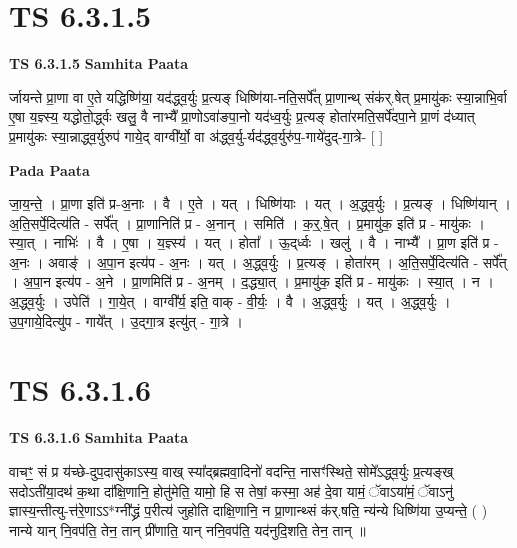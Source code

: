 \documentclass[17pt]{extarticle}
\begin{document}
\section*{ TS 6.3.1.5 }

\textbf{TS 6.3.1.5 } \newline
\textbf{Samhita Paata} \newline

र्जायन्ते प्रा॒णा वा ए॒ते यद्धिष्णि॑या॒ यद॑द्ध्व॒र्युः प्र॒त्यङ् धिष्णि॑या-नति॒सर्पे᳚त् प्रा॒णान्थ् संक॑र्.षेत् प्र॒मायु॑कः स्या॒न्नाभि॒र्वा ए॒षा य॒ज्ञ्स्य॒ यद्धोतो॒र्द्ध्वः खलु॒ वै नाभ्यै᳚ प्रा॒णोऽवा॑ङपा॒नो यद॑ध्व॒र्युः प्र॒त्यङ् होता॑रमति॒सर्पे॑दपा॒ने प्रा॒णं द॑ध्यात् प्र॒मायु॑कः स्या॒न्नाद्ध्व॒र्युरुप॑ गाये॒द् वाग्वी᳚र्यो॒ वा अ॑द्ध्व॒र्यु-र्यद॑द्ध्व॒र्युरु॑प॒-गाये॑दुद्-गा॒त्रे- [  ] \newline

\textbf{Pada Paata} \newline

जा॒य॒न्ते॒ । प्रा॒णा इति॑ प्र-अ॒नाः । वै । ए॒ते । यत् । धिष्णि॑याः । यत् । अ॒द्ध्व॒र्युः । प्र॒त्यङ् । धिष्णि॑यान् । अ॒ति॒सर्पे॒दित्य॑ति - सर्पे᳚त् । प्रा॒णानिति॑ प्र - अ॒नान् । समिति॑ । क॒र्॒.षे॒त् । प्र॒मायु॑क॒ इति॑ प्र - मायु॑कः । स्या॒त् । नाभिः॑ । वै । ए॒षा । य॒ज्ञ्स्य॑ । यत् । होता᳚ । ऊ॒द्‌र्ध्वः । खलु॑ । वै । नाभ्यै᳚ । प्रा॒ण इति॑ प्र - अ॒नः । अवाङ्॑ । अ॒पा॒न इत्य॑प - अ॒नः । यत् । अ॒द्ध्व॒र्युः । प्र॒त्यङ् । होता॑रम् । अ॒ति॒सर्पे॒दित्य॑ति - सर्पे᳚त् । अ॒पा॒न इत्य॑प - अ॒ने । प्रा॒णमिति॑ प्र - अ॒नम् । द॒द्ध्या॒त् । प्र॒मायु॑क॒ इति॑ प्र - मायु॑कः । स्या॒त् । न । अ॒द्ध्व॒र्युः । उपेति॑ । गा॒ये॒त् । वाग्वी᳚र्य॒ इति॒ वाक् - वी॒र्यः॒ । वै । अ॒द्ध्व॒र्युः । यत् । अ॒द्ध्व॒र्युः । उ॒प॒गाये॒दित्यु॑प - गाये᳚त् । उ॒द्गा॒त्र इत्यु॑त् - गा॒त्रे ।  \newline




\section*{ TS 6.3.1.6 }

\textbf{TS 6.3.1.6 } \newline
\textbf{Samhita Paata} \newline

वाचꣳ॒॒ सं प्र य॑च्छे-दुप॒दासु॑काऽस्य॒ वाख् स्या᳚द्ब्रह्मवा॒दिनो॑ वदन्ति॒ नासꣳ॑स्थिते॒ सोमे᳚ऽद्ध्व॒र्युः प्र॒त्यङ्ख् सदोऽती॑या॒दथ॑ क॒था दा᳚क्षि॒णानि॒ होतु॑मेति॒ यामो॒ हि स तेषां॒ कस्मा॒ अह॑ दे॒वा यामं॒ ॅवाऽया॑मं॒ ॅवाऽनु॑ ज्ञास्य॒न्तीत्यु-त्त॑रे॒णाऽऽ*ग्नी᳚द्ध्रं प॒रीत्य॑ जुहोति दाक्षि॒णानि॒ न प्रा॒णान्थ्सं क॑र्.षति॒ न्य॑न्ये धिष्णि॑या उ॒प्यन्ते॒ ( ) नान्ये यान् नि॒वप॑ति॒ तेन॒ तान् प्री॑णाति॒ यान् ननि॒वप॑ति॒ यद॑नुदि॒शति॒ तेन॒ तान् ॥ \newline
\end{document}
